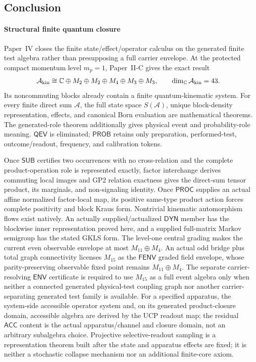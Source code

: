 \documentclass[12pt,a4paper]{article}
\begin{document}
\subsection{Conclusion}
\label{p4:sec:conclusion}
\label{p4:sec:summary}



\paragraph{Structural finite quantum closure}
\label{p4:sec:conclusion-structural-compatibility}

Paper~IV closes the finite state/effect/operator calculus on the generated
finite test algebra rather than presupposing a full carrier envelope.  At the
protected compact momentum level \(m_p=1\), Paper~II-C gives the exact result
\[
\mathcal A_{\rm kin}
\cong
\mathbb{C}\oplus M_2\oplus M_2\oplus M_4\oplus M_3\oplus M_3,
\qquad
\dim_{\mathbb{C}}\mathcal A_{\rm kin}=43.
\]
Its noncommuting blocks already contain a finite quantum-kinematic system.
For every finite direct sum \(\mathcal A\), the full state space
\(S(\mathcal A)\), unique block-density representation, effects, and
canonical Born evaluation are mathematical theorems.  The
generated-role theorem additionally gives physical event and probability-role
meaning.  \(\mathsf{QEV}\) is eliminated; \(\mathsf{PROB}\) retains only
preparation, performed-test, outcome/readout, frequency, and calibration
tokens.

Once \(\mathsf{SUB}\) certifies two occurrences with no cross-relation and
the complete product-operation role is represented exactly, factor
interchange derives commuting local images and GP2 relation exactness gives
the direct-sum tensor product, its marginals, and non-signaling identity.
Once \(\mathsf{PROC}\) supplies an actual affine
normalized factor-local map, its positive same-type product action forces
complete positivity and block Kraus form.  Nontrivial kinematic automorphism
flows exist natively.  An
actually supplied/actualized \(\mathsf{DYN}\) member has the blockwise inner representation
proved here, and a supplied full-matrix Markov semigroup has the stated GKLS
form.  The level-one central grading makes the current even observable
envelope at most \(M_{11}\oplus M_4\).  An actual odd bridge plus total graph
connectivity licenses \(M_{15}\) as the \(\mathsf{FENV}\) graded field
envelope, whose parity-preserving observable fixed point remains
\(M_{11}\oplus M_4\).  The separate carrier-resolving \(\mathsf{ENV}\) certificate is required
to use \(M_{15}\) as a full event algebra only when neither a connected
generated physical-test coupling graph nor another carrier-separating
generated test family is available.
For a specified apparatus, the system-side accessible operator system and,
on its generated product-closure domain, accessible algebra are derived by
the UCP readout map; the residual \(\mathsf{ACC}\) content is the actual
apparatus/channel and closure domain, not an arbitrary subalgebra choice.
Projective selective-readout sampling is a representation theorem built after
the state and apparatus effects are fixed; it is neither a stochastic
collapse mechanism nor an additional finite-core axiom.
\end{document}

